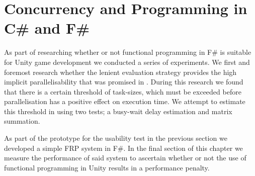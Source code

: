\chapter{Concurrency and Programming in C\# and F\#}
As part of researching whether or not functional programming in F\# is suitable for Unity game development we conducted a series of experiments. We first and foremost research whether the lenient evaluation strategy provides the high implicit parallelisability that was promised in \cite{DBLP:journals/cl/Tremblay-parallel}. During this research we found that there is a certain threshold of task-sizes, which must be exceeded before parallelisation has a positive effect on execution time. We attempt to estimate this threshold in  using two tests; a busy-wait delay estimation and matrix summation.

As part of the prototype for the usability test in the previous section we developed a simple \gls{FRP} system in F\#. In the final section of this chapter we measure the performance of said system to ascertain whether or not the use of functional programming in Unity results in a performance penalty. 




